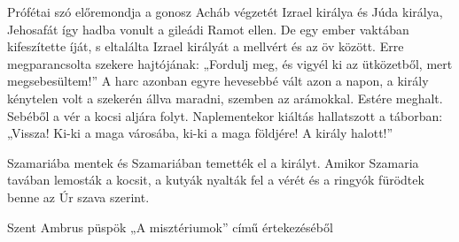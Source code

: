 \documentclass[twoside]{article}
\begin{document}
\begin{lectio}{Prófétai szó előremondja a gonosz Acháb végzetét}
Izrael királya és Júda királya, Jehosafát így hadba vonult a gileádi Ramot ellen. De egy ember vaktában kifeszítette íját, s eltalálta Izrael királyát a mellvért és az öv között. Erre megparancsolta szekere hajtójának: „Fordulj meg, és vigyél ki az ütközetből, mert megsebesültem!” A harc azonban egyre hevesebbé vált azon a napon, a király kénytelen volt a szekerén állva maradni, szemben az arámokkal. Estére meghalt. Sebéből a vér a kocsi aljára folyt. Naplementekor kiáltás hallatszott a táborban: „Vissza! Ki-ki a maga városába, ki-ki a maga földjére! A király halott!”

Szamariába mentek és Szamariában temették el a királyt. Amikor Szamaria tavában lemosták a kocsit, a kutyák nyalták fel a vérét és a ringyók fürödtek benne az Úr szava szerint.
\end{lectio}



Szent Ambrus püspök „A misztériumok” című értekezéséből

{\centering{}}
\end{document}
